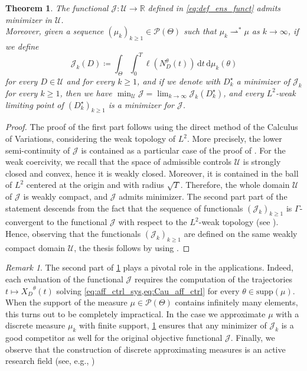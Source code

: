 \documentclass[a4paper,12pt, reqno]{amsart}
\theoremstyle{plain}
\newtheorem{theorem}{Theorem}[section]
\theoremstyle{definition}
\theoremstyle{remark}
\newtheorem{remark}{Remark}
\numberwithin{equation}{section}
\newcommand{\J}{\mathcal{J}}
\newcommand{\R}{\mathbb{R}}
\newcommand{\U}{\mathcal{U}}
\newcommand{\weak}{\rightharpoonup}
\newcommand{\de}{\,\mathrm{d}}
\begin{document}
\begin{theorem} \label{thm:exist_Gamma}
    The functional $\J\colon \U\to \R$ defined in \cref{eq:def_ens_funct} admits minimizer in $\U$.\\
    Moreover, given a sequence $(\mu_{k})_{{k}\geq1}\in\mathcal{P}(\Theta)$ such that $\mu_{k}\weak^* \mu$ as ${k}\to\infty$, if we define 
    \begin{equation*}
        \J_{k}({D}) \coloneqq  \int_\Theta  \int_0^T \ell\left({ N_D^\theta(t )}\right)  
    \de t \de\mu_{k}(\theta)
    \end{equation*}
    for every ${D}\in\U$ and for every ${k}\geq1$, and if we denote with ${D}^\star_{k}$ a minimizer of $\J_{k}$ for every ${k}\geq1$, then we have $\min_\U \J = \lim_{{k}\to\infty}\J_{k}({D}^\star_{k})$, and every $L^2$-weak limiting point of $({D}^\star_{k})_{{k}\geq1}$ is a minimizer for $\J$. 
\end{theorem}
\begin{proof}
    The proof of the first part follows using the direct method of the Calculus of Variations, considering the weak topology of $L^2$. More precisely, the lower semi-continuity of $\J$ is contained as a particular case of the proof of \cite[Theorem~3.2]{Scag23}. 
    For the weak coercivity, we recall that the space of admissible controls $\U$ is strongly closed and convex, hence it is weakly closed. Moreover, it is contained in the ball of $L^2$ centered at the origin and with radius $\sqrt{T}$. Therefore, the whole domain $\U$ of $\J$ is weakly compact, and $\J$ admits minimizer.
    The second part part of the statement descends from the fact that the sequence of functionals $(\J_{k})_{{k}\geq1}$ is $\Gamma$-convergent to the functional $\J$ with respect to the $L^2$-weak topology (see \cite[Theorem~4.6]{Scag23}). Hence, observing that the functionals $(\J_{k})_{{k}\geq1}$ are defined on the same weakly compact domain $\U$, the thesis follows by using \cite[Corollary~4.8]{Scag23}.
\end{proof}

\begin{remark} \label{rmk:G_conv}
    The second part of \cref{thm:exist_Gamma} plays a pivotal role in the applications. Indeed, each evaluation of the functional $\J$ requires the computation of the trajectories $t\mapsto {X_D}^\theta(t)$ solving \cref{eq:aff_ctrl_sys,eq:Cau_aff_ctrl} for every $\theta\in \mathrm{supp}(\mu)$. 
    When the support of the measure $\mu\in\mathcal{P}(\Theta)$ contains infinitely many elements, this turns out to be completely impractical.
    In the case we approximate $\mu$ with a discrete measure $\mu_{k}$ with finite support, \cref{thm:exist_Gamma} ensures that any minimizer of $\J_{k}$ is a good competitor as well for the original objective functional $\J$. Finally, we observe that the construction of discrete approximating measures is an active research field (see, e.g., \cite{merigot2021non,auricchio2024facility,auricchio2024k,auricchio2024extended})
\end{remark}
\end{document}
